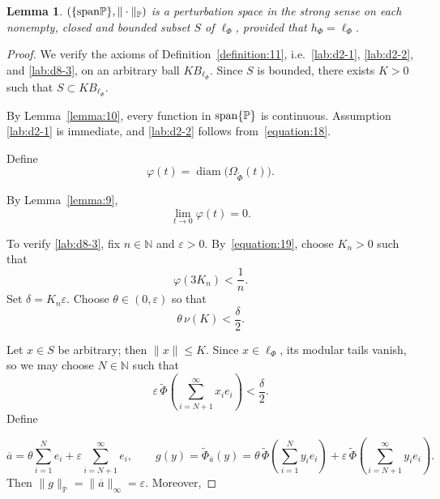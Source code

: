 \documentclass[12pt]{article}
\theoremstyle{thmstyleone}%
\newtheorem{lemma}[theorem]{Lemma}
\theoremstyle{thmstyletwo}%
\theoremstyle{thmstylethree}%
\begin{document}
{{ %

\begin{lemma}\label{lemma:11}
    $(\{{\rm span} \mathbb{P}\},\|\cdot\|_{\mathbb{P}})$ is a perturbation space in the strong sense on each nonempty, closed and bounded subset $S$ of $\ell_{\Phi}$, provided that $h_\Phi=\ell_\Phi$.
\end{lemma}


{%
\begin{proof}
    We verify the axioms of Definition~\ref{definition:11}, i.e.\ \ref{lab:d2-1}, \ref{lab:d2-2}, and \ref{lab:d8-3}, on an arbitrary ball $KB_{\ell_\Phi}$.
    Since $S$ is bounded, there exists $K>0$ such that $S\subset KB_{\ell_\Phi}$.

    By Lemma~\ref{lemma:10}, every function in ${\rm span}\{\mathbb{P}\}$ is continuous. 
    Assumption \ref{lab:d2-1} is immediate, and \ref{lab:d2-2} follows from~\eqref{equation:18}.

    Define 
    \[
        \varphi(t)=\operatorname{diam}\bigl(\Omega_{\widetilde{\Phi}}(t)\bigr).
    \]


    By Lemma~\ref{lemma:9},
    \begin{equation}\label{equation:19}
        \lim_{t\to 0}\varphi(t)=0 .
    \end{equation}

    To verify \ref{lab:d8-3}, fix $n\in\mathbb{N}$ and $\varepsilon>0$.  
    By~\eqref{equation:19}, choose $K_n>0$ such that
    \begin{equation}\label{equation:20}
        \varphi(3K_n)<\frac{1}{n}.
    \end{equation}
    Set $\delta=K_n\varepsilon$.  
    Choose $\theta\in(0,\varepsilon)$ so that
    \begin{equation}\label{equation:21}
        \theta\,\nu(K)<\frac{\delta}{2}.
    \end{equation}

    Let $x\in S$ be arbitrary; then $\|x\|\le K$.  
    Since $x\in\ell_\Phi$, its modular tails vanish, so we may choose $N\in\mathbb{N}$ such that
    \begin{equation}\label{equation:22}
        \varepsilon\,\widetilde{\Phi}\!\left(\sum_{i=N+1}^\infty x_i e_i\right)
        <\frac{\delta}{2}.
    \end{equation}
    Define
    

\[
        \overline{a}
        =\theta\sum_{i=1}^N e_i
        +\varepsilon\sum_{i=N+1}^\infty e_i ,
    \qquad
        g(y)=\widetilde{\Phi}_{\overline{a}}(y)
        =\theta\,\widetilde{\Phi}\!\left(\sum_{i=1}^N y_i e_i\right)
        +\varepsilon\,\widetilde{\Phi}\!\left(\sum_{i=N+1}^\infty y_i e_i\right).
    \]
    Then $\|g\|_{\mathbb{P}}=\|\overline{a}\|_\infty=\varepsilon$.  
    Moreover,


\end{proof}}}}
\end{document}
